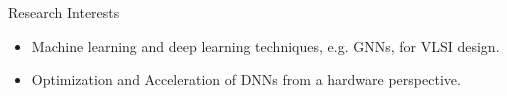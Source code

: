 
\begin{rSection}{Research Interests}
    
\begin{itemize}
    \item Machine learning and deep learning techniques, e.g. GNNs, for VLSI design.
    \item Optimization and Acceleration of DNNs from a hardware perspective.
\end{itemize}
\end{rSection}




